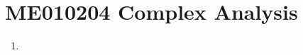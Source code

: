 
\chapter{ME010204 Complex Analysis}
\begin{enumerate}[label=Week \arabic*]
	\item 
\end{enumerate}
